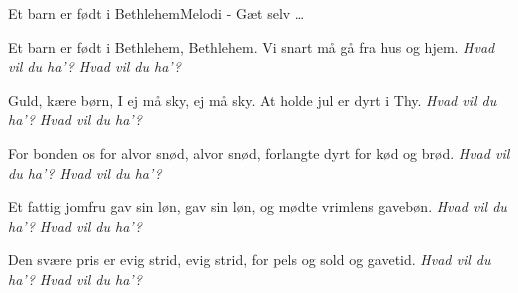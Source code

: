 \begin{sang}{Et barn er født i Bethlehem}{Melodi - Gæt selv \ldots}
\begin{vers}
Et barn er født i Bethlehem,
Bethlehem.
Vi snart må gå fra hus og hjem.
{\em Hvad vil du ha'? Hvad vil du ha'?}
\end{vers}
\begin{vers}
Guld, kære børn, I ej må sky,
ej må sky.
At holde jul er dyrt i Thy.
{\em Hvad vil du ha'? Hvad vil du ha'?}
\end{vers}
\begin{vers}
For bonden os for alvor snød,
alvor snød,
forlangte dyrt for kød og brød.
{\em Hvad vil du ha'? Hvad vil du ha'?}
\end{vers}
\begin{vers}
Et fattig jomfru gav sin løn,
gav sin løn,
og mødte vrimlens gavebøn.
{\em Hvad vil du ha'? Hvad vil du ha'?}
\end{vers}
\begin{vers}
Den svære pris er evig strid,
evig strid,
for pels og sold og gavetid.
{\em Hvad vil du ha'? Hvad vil du ha'?}
\end{vers}
\end{sang}